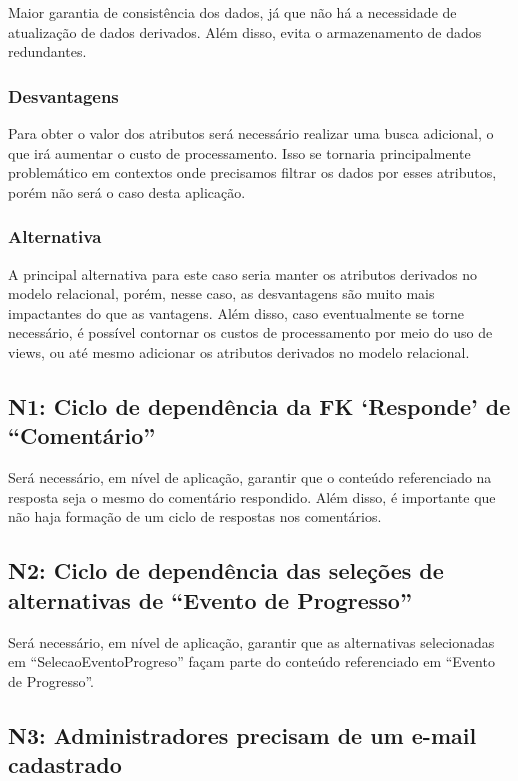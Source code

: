 Maior garantia de consistência dos dados, já que não há a necessidade de
atualização de dados derivados. Além disso, evita o armazenamento de dados
redundantes.

\subsubsection{Desvantagens}

Para obter o valor dos atributos será necessário realizar uma busca adicional,
o que irá aumentar o custo de processamento. Isso se tornaria principalmente
problemático em contextos onde precisamos filtrar os dados por esses atributos,
porém não será o caso desta aplicação.

\subsubsection{Alternativa}

A principal alternativa para este caso seria manter os atributos derivados no 
modelo relacional, porém, nesse caso, as desvantagens são muito mais impactantes
do que as vantagens. Além disso, caso eventualmente se torne necessário, é possível
contornar os custos de processamento por meio do uso de views, ou até mesmo adicionar
os atributos derivados no modelo relacional. 

\subsection{\textbf{N1:} Ciclo de dependência da FK `Responde' de ``Comentário''}

Será necessário, em nível de aplicação, garantir que o conteúdo referenciado na
resposta seja o mesmo do comentário respondido. Além disso, é importante que
não haja formação de um ciclo de respostas nos comentários.

\subsection{\textbf{N2:} Ciclo de dependência das seleções de alternativas de ``Evento de Progresso''}

Será necessário, em nível de aplicação, garantir que as alternativas
selecionadas em ``SelecaoEventoProgreso'' façam parte do conteúdo referenciado
em ``Evento de Progresso''.

\subsection{\textbf{N3:} Administradores precisam de um e-mail cadastrado}

